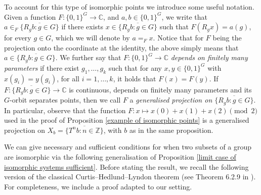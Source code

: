 \documentclass{amsart}
\numberwithin{equation}{section}
\theoremstyle{definition}
\theoremstyle{plain}
\newcommand{\C}{{\mathbb C}}
\newcommand{\Z}{{\mathbb Z}}
\begin{document}
To account for this type of isomorphic points we
introduce some useful 
notation. Given a function $F: \{0,1\}^G\to \C$, and $a,b\in \{0,1\}^G$, we write that $a\in_{F} \overline{\{R_gb:g\in G\}}$ if there exists $x\in \overline{\{R_gb:g\in G\}}$ such that $F(R_gx)=a(g)$, for every $g\in G$, which we will denote by $a=_{F}x$. Notice that for $F$ being the projection onto the coordinate at the identity, the above simply means that $a\in \overline{\{R_gb:g\in G\}}$. We further say that $F: \{0,1\}^G\to \C$ \textit{depends on finitely many parameters} if there exist $g_1,\ldots,g_k$ such that for any $x,y\in \{0,1\}^G$ with $x(g_i)=y(g_i)$, for all $i=1,\ldots,k$, it holds that $F(x)=F(y)$. If $F:\overline{\{R_gb:g\in G\}} \to \C$ is continuous, depends on finitely many parameters and its $G$-orbit separates points, then we call $F$ a \textit{generalised projection on $\overline{\{R_gb:g\in G\}}$}. In particular, observe that the function $F:x\mapsto x(0)+x(1)+x(2) \pmod{2}$ used in the proof of Proposition \ref{example of isomorphic points} is a generalised projection on $X_b=\overline{\{T^nb:n\in \Z\}}$, with $b$ as in the same proposition.

We can give necessary and sufficient conditions for 
when two subsets of a group are isomorphic via the 
following generalisation of Proposition 
\ref{limit case of isomorphic systems sufficient}. Before stating the result, we recall the following version of the classical Curtis--Hedlund--Lyndon theorem (see Theorem 6.2.9 in \cite{LindMarcus}). For completeness, we include a proof adapted to our setting. 
\end{document}
